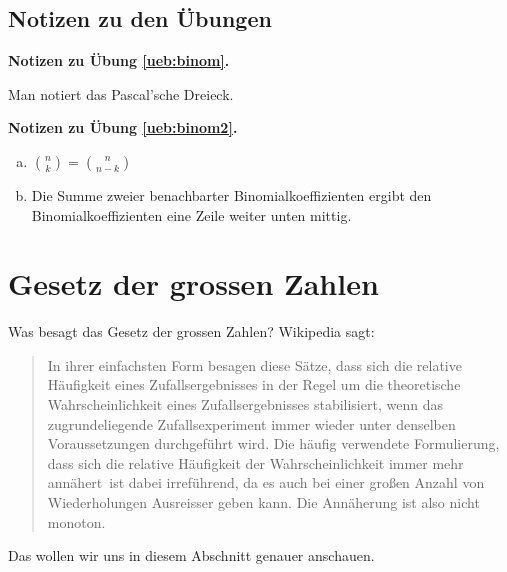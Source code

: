 \documentclass[%
11pt,%
twoside,%
titlepage,%
german,%
headsepline%
]{scrartcl}
\newcounter{theo}[section]\setcounter{theo}{0}
\newcommand{\concatueb}[1]{ueb:#1}%
\newcommand{\concatlsg}[1]{lsg:#1}%
\newenvironment{lsg}[1]{%
    \par\noindent\textbf{Notizen zu Übung \ref{\concatueb{#1}}.}%
    \label{\concatlsg{#1}}
}{%
    \par%
}
\begin{document}
\clearpage

\subsection{Notizen zu den \"Ubungen}

\begin{lsg}{binom}
Man notiert das Pascal'sche Dreieck.
\end{lsg}
\begin{lsg}{binom2}
\begin{enumerate}[a)]
\item $\binom{n}{k}=\binom{n}{n-k}$
\item Die Summe zweier benachbarter Binomialkoeffizienten ergibt den Binomialkoeffizienten eine Zeile weiter unten mittig.
\end{enumerate}
\end{lsg}

\clearpage





\clearpage

\section{Gesetz der grossen Zahlen}

Was besagt das Gesetz der grossen Zahlen? Wikipedia sagt:

\begin{quote}
    In ihrer einfachsten Form besagen diese Sätze, dass sich die relative Häufigkeit eines Zufallsergebnisses in der Regel um die theoretische Wahrscheinlichkeit eines Zufallsergebnisses stabilisiert, wenn das zugrundeliegende Zufallsexperiment immer wieder unter denselben Voraussetzungen durchgeführt wird. Die häufig verwendete Formulierung, dass sich die relative Häufigkeit der Wahrscheinlichkeit \glqq immer mehr annähert\grqq\ ist dabei irreführend, da es auch bei einer großen Anzahl von Wiederholungen Ausreisser geben kann. Die Annäherung ist also nicht monoton.
\end{quote}

Das wollen wir uns in diesem Abschnitt genauer anschauen.
\end{document}
